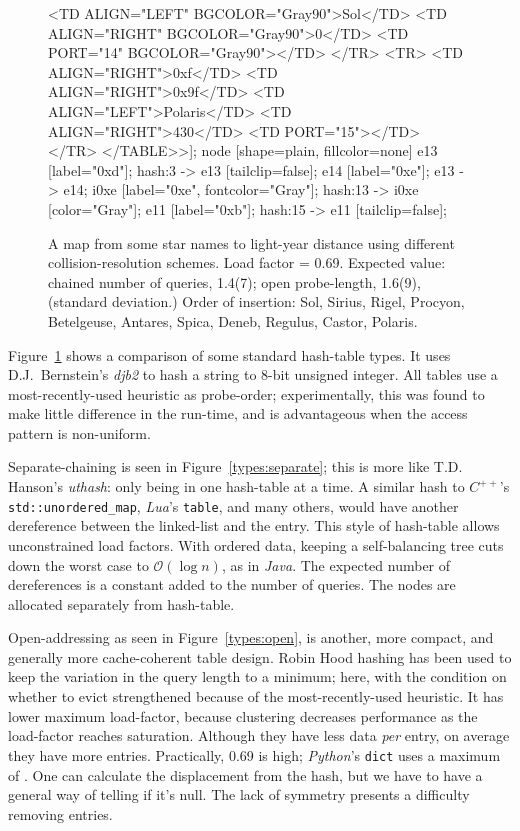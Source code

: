 \documentclass[12pt]{article}
\newcommand{\code}[1]{\colorbox{light-gray}{\texttt{#1}}}
\begin{document}
\begin{figure}
{{		<TD ALIGN="LEFT" BGCOLOR="Gray90">Sol</TD>
		<TD ALIGN="RIGHT" BGCOLOR="Gray90">0</TD>
		<TD PORT="14" BGCOLOR="Gray90">
	</TR>
	<TR>
		<TD ALIGN="RIGHT">0xf</TD>
		<TD ALIGN="RIGHT">0x9f</TD>
		<TD ALIGN="LEFT">Polaris</TD>
		<TD ALIGN="RIGHT">430</TD>
		<TD PORT="15">
	</TR>
</TABLE>>];
	node [shape=plain, fillcolor=none]
	e13 [label="0xd"];
	hash:3 -> e13 [tailclip=false];
	e14 [label="0xe"];
	e13 -> e14;
	i0xe [label="0xe", fontcolor="Gray"];
	hash:13 -> i0xe [color="Gray"];
	e11 [label="0xb"];
	hash:15 -> e11 [tailclip=false];
		}
	}
	\caption{A map from some star names to light-year distance using different collision-resolution schemes. Load factor  = 0.69. Expected value: chained number of queries, 1.4(7);
open probe-length, 1.6(9),
(standard deviation.)\label{types}
Order of insertion: Sol, Sirius, Rigel, Procyon, Betelgeuse, Antares, Spica, Deneb, Regulus, Castor, Polaris.}
\end{figure}

Figure~\ref{types} shows a comparison of some standard hash-table types. It uses D.J.~Bernstein's {\it djb2} to hash a string to 8-bit unsigned integer. All tables use a most-recently-used heuristic as probe-order; experimentally, this was found to make little difference in the run-time, and is advantageous when the access pattern is non-uniform\cite{brent1973reducing, sleator1985self}.

Separate-chaining is seen in Figure~\ref{types:separate}; this is more like T.D. Hanson's {\it uthash}: only being in one hash-table at a time. A similar hash to {\it $C^{++}$}'s \code{std::unordered\_map}, {\it Lua}'s \code{table}, and many others, would have another dereference between the linked-list and the entry. This style of hash-table allows unconstrained load factors. With ordered data, keeping a self-balancing tree cuts down the worst case to $\mathcal{O}(\log n)$\cite{knuth1998sorting}, as in {\it Java}. The expected number of dereferences is a constant added to the number of queries. The nodes are allocated separately from hash-table.

Open-addressing\cite{peterson1957addressing} as seen in Figure~\ref{types:open}, is another, more compact, and generally more cache-coherent table design. Robin Hood hashing\cite{celis1985robin} has been used to keep the variation in the query length to a minimum; here, with the condition on whether to evict strengthened because of the most-recently-used heuristic. It has lower maximum load-factor, because clustering decreases performance as the load-factor reaches saturation.\cite{skiena2008algorithm} Although they have less data {\it per} entry, on average they have more entries. Practically, 0.69 is high; {\it Python}'s \code{dict}\cite{knuth1998sorting} uses a maximum of . One can calculate the displacement from the hash, but we have to have a general way of telling if it's null. The lack of symmetry presents a difficulty removing entries.
\end{document}
